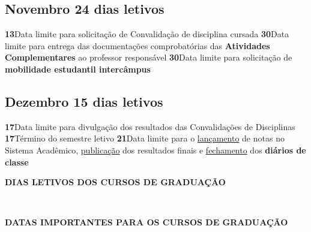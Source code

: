 \documentclass[thesis]{hmcposter}
\begin{document}
\begin{poster}
\subsection{Novembro \hfill 24 dias letivos}\textbf{13}\qquad Data limite para solicitação de Convalidação de disciplina cursada \newline \null\textbf{30}\qquad Data limite para entrega das documentações comprobatórias das \textbf{Atividades Complementares} ao professor responsável \newline \null\textbf{30}\qquad Data limite para solicitação de \textbf{mobilidade estudantil intercâmpus} \newline \null\subsection{Dezembro \hfill 15 dias letivos}\textbf{17}\qquad Data limite para divulgação dos resultados das Convalidações de Disciplinas \newline \null\textbf{17}\qquad Término do semestre letivo \newline \null\textbf{21}\qquad Data limite para o \underline{lançamento} de notas no Sistema Acadêmico, \underline{publicação} dos resultados finais e \underline{fechamento} dos \textbf{diários de classe} \newline \null\newpage
~
\vfill
\begin{center}
\large \textbf{DIAS LETIVOS DOS CURSOS DE GRADUAÇÃO}
\newline
\null
\newline
\begin{table}
\centering
{}
\end{table}
\null
\end{center}
\vfill
\null
\columnbreak
~
\vfill
\begin{center}
\large \textbf{DATAS IMPORTANTES PARA OS CURSOS DE GRADUAÇÃO}
\newline

\end{center}
\end{poster}
\end{document}
